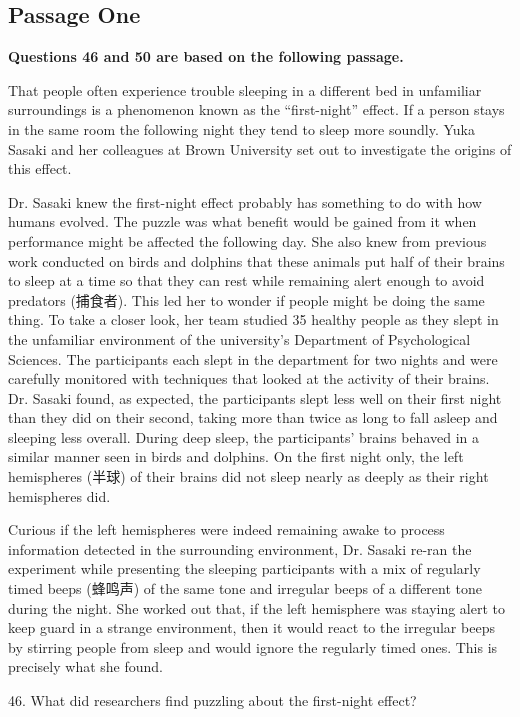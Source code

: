 \documentclass[UTF8,11pt]{ctexart}
\begin{document}
\subsection*{\textbf{Passage One}}


\textbf{Questions 46 and 50 are based on the following passage.}


That people often experience trouble sleeping in a different bed in unfamiliar surroundings is a phenomenon known as the “first-night” effect. If a person stays in the same room the following night they tend to sleep more soundly. Yuka Sasaki and her colleagues at Brown University set out to investigate the origins of this effect.


Dr. Sasaki knew the first-night effect probably has something to do with how humans evolved. The puzzle was what benefit would be gained from it when performance might be affected the following day. She also knew from previous work conducted on birds and dolphins that these animals put half of their brains to sleep at a time so that they can rest while remaining alert enough to avoid predators (捕食者). This led her to wonder if people might be doing the same thing. To take a closer look, her team studied 35 healthy people as they slept in the unfamiliar environment of the university’s Department of Psychological Sciences. The participants each slept in the department for two nights and were carefully monitored with techniques that looked at the activity of their brains. Dr. Sasaki found, as expected, the participants slept less well on their first night than they did on their second, taking more than twice as long to fall asleep and sleeping less overall. During deep sleep, the participants’ brains behaved in a similar manner seen in birds and dolphins. On the first night only, the left hemispheres (半球) of their brains did not sleep nearly as deeply as their right hemispheres did.


Curious if the left hemispheres were indeed remaining awake to process information detected in the surrounding environment, Dr. Sasaki re-ran the experiment while presenting the sleeping participants with a mix of regularly timed beeps (蜂鸣声) of the same tone and irregular beeps of a different tone during the night. She worked out that, if the left hemisphere was staying alert to keep guard in a strange environment, then it would react to the irregular beeps by stirring people from sleep and would ignore the regularly timed ones. This is precisely what she found.


46. What did researchers find puzzling about the first-night effect?
\end{document}
